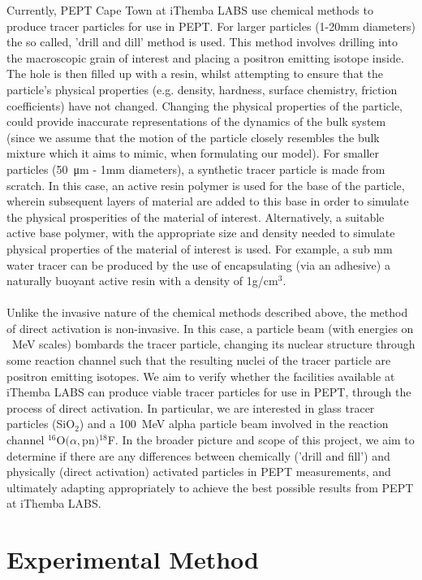 \documentclass[]{article}
\begin{document}
Currently, PEPT Cape Town at iThemba LABS use chemical methods to produce tracer particles for use in PEPT. For larger particles (1-20mm diameters) the so called, 'drill and dill' method is used. This method involves drilling into the macroscopic grain of interest and placing a positron emitting isotope inside. The hole is then filled up with a resin, whilst attempting to ensure that the particle's physical properties (e.g. density, hardness, surface chemistry, friction coefficients) have not changed. Changing the physical properties of the particle, could provide inaccurate representations of the dynamics of the bulk system (since we assume that the motion of the particle closely resembles the bulk mixture which it aims to mimic, when formulating our model). For smaller particles (\SI{50}{\micro \metre} - 1mm diameters), a synthetic tracer particle is made from scratch. In this case, an active resin polymer is used for the base of the particle, wherein subsequent layers of material are added to this base in order to simulate the physical prosperities of the material of interest. Alternatively, a suitable active base polymer, with the appropriate size and density needed to simulate physical properties of the material of interest is used. For example, a sub mm water tracer can be produced by the use of encapsulating (via an adhesive) a naturally buoyant active resin with a density of 1g/cm$^3$.\\\\
Unlike the invasive nature of the chemical methods described above, the method of direct activation is non-invasive. In this case, a particle beam (with energies on \SI{}{\mega \electronvolt} scales) bombards the tracer particle, changing its nuclear structure through some reaction channel such that the resulting nuclei of the tracer particle are positron emitting isotopes. We aim to verify whether the facilities available at iThemba LABS can produce viable tracer particles for use in PEPT, through the process of direct activation. In particular, we are interested in glass tracer particles (SiO$_2$) and a \SI{100}{\mega \electronvolt} alpha particle beam involved in the reaction channel ${}^{16}$O$(\alpha,$pn$){}^{18}$F. In the broader picture and scope of this project, we aim to determine if there are any differences between chemically ('drill and fill') and physically (direct activation) activated particles in PEPT measurements, and ultimately adapting appropriately to achieve the best possible results from PEPT at iThemba LABS.
\pagebreak
\section{Experimental Method}\label{experiment}
\end{document}
